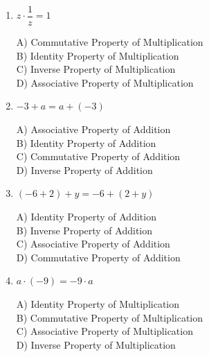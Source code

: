 \documentclass[11pt]{article}
\begin{document}
\begin{enumerate}
\begin{minipage}{\linewidth}
A) Associative Property of Multiplication \\
B) Inverse Property of Multiplication \\
C) Identity Property of Multiplication \\
D) Commutative Property of Multiplication
\end{minipage}
  \vspace{0.3cm}
  \item $z \cdot \dfrac{1}{z} = 1$
\\[2pt]
\begin{minipage}{\linewidth}
A) Commutative Property of Multiplication \\
B) Identity Property of Multiplication \\
C) Inverse Property of Multiplication \\
D) Associative Property of Multiplication
\end{minipage}
  \vspace{0.3cm}
  \item $-3 + a = a + (-3)$
\\[2pt]
\begin{minipage}{\linewidth}
A) Associative Property of Addition \\
B) Identity Property of Addition \\
C) Commutative Property of Addition \\
D) Inverse Property of Addition
\end{minipage}
  \vspace{0.3cm}
  \item $(-6 + 2) + y = -6 + (2 + y)$
\\[2pt]
\begin{minipage}{\linewidth}
A) Identity Property of Addition \\
B) Inverse Property of Addition \\
C) Associative Property of Addition \\
D) Commutative Property of Addition
\end{minipage}
  \vspace{0.3cm}
  \item $a \cdot (-9) = -9 \cdot a$
\\[2pt]
\begin{minipage}{\linewidth}
A) Identity Property of Multiplication \\
B) Commutative Property of Multiplication \\
C) Associative Property of Multiplication \\
D) Inverse Property of Multiplication

\end{minipage}
\end{enumerate}
\end{document}
